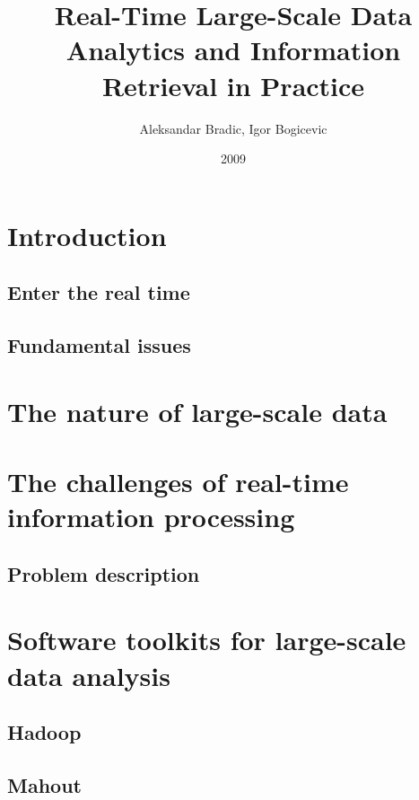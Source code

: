 \documentclass[]{book}    %
\begin{document}
\author{Aleksandar Bradic, Igor Bogicevic}
\title{Real-Time Large-Scale Data Analytics and Information Retrieval in Practice}
\date{2009}

\maketitle 

  \frontmatter 
  \tableofcontents 


\mainmatter 

\chapter{Introduction}
\label{altrings} %

\section{Enter the real time}
\section{Fundamental issues}

\chapter{The nature of large-scale data}

\chapter{The challenges of real-time information processing}
\section{Problem description}

\chapter{Software toolkits for large-scale data analysis}
\section{Hadoop}
\section{Mahout}
\end{document}
